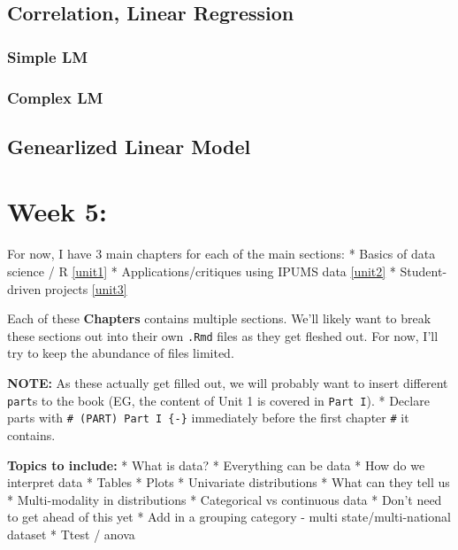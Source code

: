 \documentclass[
]{book}
\begin{document}
\hypertarget{correlation-linear-regression}{%
\subsection{Correlation, Linear Regression}\label{correlation-linear-regression}}

\hypertarget{simple-lm}{%
\subsubsection{Simple LM}\label{simple-lm}}

\hypertarget{complex-lm}{%
\subsubsection{Complex LM}\label{complex-lm}}

\hypertarget{genearlized-linear-model}{%
\subsection{Genearlized Linear Model}\label{genearlized-linear-model}}

\hypertarget{week-5}{%
\section{Week 5:}\label{week-5}}

For now, I have 3 main chapters for each of the main sections:
* Basics of data science / R \ref{unit1}
* Applications/critiques using IPUMS data \ref{unit2}
* Student-driven projects \ref{unit3}

Each of these \textbf{Chapters} contains multiple sections. We'll likely want to break these sections out into their own \texttt{.Rmd} files as they get fleshed out. For now, I'll try to keep the abundance of files limited.

\textbf{NOTE:} As these actually get filled out, we will probably want to insert different \texttt{part}s to the book (EG, the content of Unit 1 is covered in \texttt{Part\ I}).
* Declare parts with \texttt{\#\ (PART)\ Part\ I\ \{-\}} immediately before the first chapter \texttt{\#} it contains.

\textbf{Topics to include:}
* What is data?
* Everything can be data
* How do we interpret data
* Tables
* Plots
* Univariate distributions
* What can they tell us
* Multi-modality in distributions
* Categorical vs continuous data
* Don't need to get ahead of this yet
* Add in a grouping category - multi state/multi-national dataset
* Ttest / anova
\end{document}
